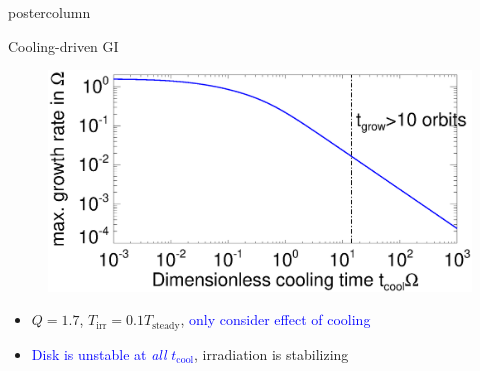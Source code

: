 \documentclass[final,hyperref={pdfpagelabels=false}]{beamer}
\newlength{\columnheight}
\begin{document}
\begin{frame}
\begin{columns}
    \begin{column}{.49\textwidth}
      \begin{beamercolorbox}[center,wd=\textwidth]{postercolumn}
        \begin{minipage}[T]{.95\textwidth} %
          \parbox[t][\columnheight]{\textwidth}{   
    
            \begin{block}{{\Large Cooling-driven GI}}
                \justifying
                \vspace{-.1cm}
                \begin{figure}
                  \includegraphics[width=\linewidth,clip=true,trim=0cm 0cm 0cm 1.25cm]{figures/2dinvisc_theta}
                \end{figure}
                \vspace{-.5cm}
                \begin{itemize}
                \item $Q=1.7$, $T_\mathrm{irr}=0.1T_\mathrm{steady}$,
                  \textcolor{blue}{only consider effect of cooling} 
                \item \textcolor{blue}{Disk is unstable at \emph{all}
                  $t_\mathrm{cool}$}, irradiation is stabilizing
                \end{itemize}
              \end{block}
              
}
\end{minipage}
\end{beamercolorbox}
\end{column}
\end{columns}
\end{frame}
\end{document}
